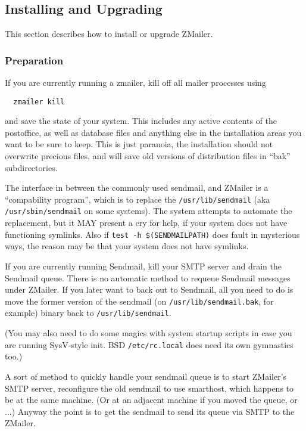 \subsection{Installing and Upgrading}

This section describes how to install or upgrade ZMailer.




\subsubsection{Preparation}

If you are currently running a zmailer, kill off all mailer processes
using
\begin{verbatim}
  zmailer kill
\end{verbatim}

and save the state of your system.  This includes any active
contents of the postoffice, as well as database files and
anything else in the installation areas you want to be sure
to keep.  This is just paranoia, the installation should not
overwrite precious files, and will save old versions of
distribution files in ``bak'' subdirectories.

The interface in between the commonly used sendmail, and ZMailer
is a ``compability program'', which is to replace the {\tt /usr/lib/sendmail}
(aka {\tt /usr/sbin/sendmail} on some systems).
The system attempts to automate the replacement, but it MAY present
a cry for help, if your system does not have functioning symlinks.
Also if {\tt test -h \$(SENDMAILPATH)} does fault in mysterious ways,
the reason may be that your system does not have symlinks.

If you are currently running Sendmail, kill your SMTP server
and drain the Sendmail queue.  There is no automatic method
to requeue Sendmail messages under ZMailer.  If you later want
to back out to Sendmail, all you need to do is move the former
version of the sendmail (on {\tt /usr/lib/sendmail.bak}, for example)
binary back to {\tt /usr/lib/sendmail}.

(You may also need to do some magics with system startup scripts
in case you are running SysV-style init. BSD {\tt /etc/rc.local}
does need its own gymnastics too.)

A sort of method to quickly handle your sendmail queue is to
start ZMailer's SMTP server, reconfigure the old sendmail to
use smarthost, which happens to be at the same machine.
(Or at an adjacent machine if you moved the queue, or ...)
Anyway the point is to get the sendmail to send its queue
via SMTP to the ZMailer.




